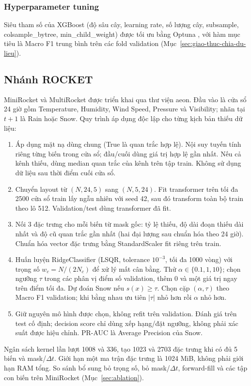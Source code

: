 \subsubsection{Hyperparameter tuning}
\label{sec:tuning-classic-ml}

Siêu tham số của XGBoost (độ sâu cây, learning rate, số lượng cây, subsample,
colsample\_bytree, min\_child\_weight) được tối ưu bằng Optuna \cite{akiba2019optuna},
với hàm mục tiêu là Macro F1 trung bình trên các fold validation (Mục~\ref{sec:giao-thuc-chia-du-lieu}).

\subsection{Nhánh ROCKET}
\label{sec:nhanh-rocket}

MiniRocket \cite{dempster2021minirocket} và MultiRocket \cite{tan2022multirocket} được triển khai qua thư viện aeon. Đầu vào là cửa sổ 24 giờ gồm Temperature, Humidity, Wind Speed, Pressure và Visibility; nhãn tại $t+1$ là Rain hoặc Snow. Quy trình áp dụng độc lập cho từng kịch bản thiếu dữ liệu:
\begin{enumerate}
  \item Áp dụng mặt nạ dùng chung (True là quan trắc hợp lệ). Nội suy tuyến tính riêng từng biến trong cửa sổ; đầu/cuối dùng giá trị hợp lệ gần nhất. Nếu cả kênh thiếu, dùng median quan trắc của kênh trên tập train. Không sử dụng dữ liệu sau thời điểm cuối cửa sổ.
  \item Chuyển layout từ $(N,24,5)$ sang $(N,5,24)$. Fit transformer trên tối đa 2500 cửa sổ train lấy ngẫu nhiên với seed 42, sau đó transform toàn bộ train theo lô 512. Validation/test dùng transformer đã fit.
  \item Nối 3 đặc trưng cho mỗi biến từ mask gốc: tỷ lệ thiếu, độ dài đoạn thiếu dài nhất và độ cũ quan trắc gần nhất (hai đại lượng sau chuẩn hóa theo 24 giờ). Chuẩn hóa vector đặc trưng bằng StandardScaler fit riêng trên train.
  \item Huấn luyện RidgeClassifier (LSQR, tolerance $10^{-3}$, tối đa 1000 vòng) với trọng số $w_c=N/(2N_c)$ để xử lý mất cân bằng. Thử $\alpha\in\{0.1,1,10\}$; chọn ngưỡng $\tau$ trong các phân vị điểm số validation, thêm 0 và một giá trị ngay trên điểm tối đa. Dự đoán Snow nếu $s(x)\geq\tau$. Chọn cặp $(\alpha,\tau)$ theo Macro F1 validation; khi bằng nhau ưu tiên $|\tau|$ nhỏ hơn rồi $\alpha$ nhỏ hơn.
  \item Giữ nguyên mô hình được chọn, không refit trên validation. Đánh giá trên test cố định; decision score chỉ dùng xếp hạng/đặt ngưỡng, không phải xác suất được hiệu chỉnh. PR-AUC là Average Precision của Snow.
\end{enumerate}
Ngân sách kernel lần lượt 1008 và 336, tạo 1023 và 2703 đặc trưng khi có đủ 5 biến và mask/$\Delta t$. Giới hạn một ma trận đặc trưng là 1024 MiB, không phải giới hạn RAM tổng. So sánh bổ sung bỏ trọng số, bỏ mask/$\Delta t$, forward-fill và các tập con biến trên MiniRocket (Mục~\ref{sec:ablation}).

